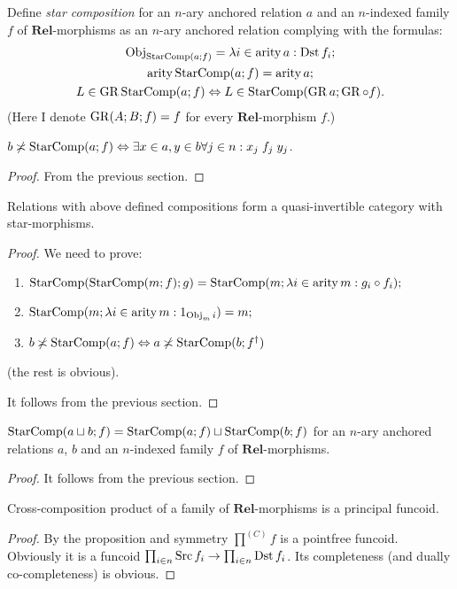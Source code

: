 Define \emph{star composition} for an $n$-ary anchored relation $a$
and an $n$-indexed family $f$ of $\mathbf{Rel}$-morphisms as an
$n$-ary anchored relation complying with the formulas: 
\begin{gather*}
\operatorname{Obj}_{\operatorname{StarComp}(a;f)}=\lambda i\in\operatorname{arity} a:\operatorname{Dst} f_{i};\\
\operatorname{arity}\operatorname{StarComp}(a;f)=\operatorname{arity} a;\\
L\in\operatorname{GR}\operatorname{StarComp}(a;f)\Leftrightarrow L\in\operatorname{StarComp}(\operatorname{GR} a;\operatorname{GR}\circ f).
\end{gather*}
(Here I denote $\operatorname{GR}(A;B;f)=f$ for every $\mathbf{Rel}$-morphism $f$.)
\begin{prop}
$b\not\asymp\operatorname{StarComp}(a;f)\Leftrightarrow\exists x\in a,y\in b\forall j\in n:x_{j}\mathrel{f_{j}}y_{j}$.\end{prop}
\begin{proof}
From the previous section.\end{proof}
\begin{thm}
Relations with above defined compositions form a quasi-invertible
category with star-morphisms.\end{thm}
\begin{proof}
We need to prove:
\begin{enumerate}
\item $\operatorname{StarComp}(\operatorname{StarComp}(m;f);g)=\operatorname{StarComp}(m;\lambda i\in\operatorname{arity} m:g_{i}\circ f_{i});$
\item $\operatorname{StarComp}(m;\lambda i\in\operatorname{arity} m:1_{\operatorname{Obj}_{m}i})=m;$
\item $b\not\asymp\operatorname{StarComp}(a;f)\Leftrightarrow a\not\asymp\operatorname{StarComp}(b;f^{\dagger})$
\end{enumerate}
(the rest is obvious).

It follows from the previous section.\end{proof}
\begin{prop}
$\operatorname{StarComp}(a\sqcup b;f)=\operatorname{StarComp}(a;f)\sqcup\operatorname{StarComp}(b;f)$ for an
$n$-ary anchored relations $a$, $b$ and an $n$-indexed family
$f$ of $\mathbf{Rel}$-morphisms.\end{prop}
\begin{proof}
It follows from the previous section.\end{proof}
\begin{thm}
Cross-composition product of a family of $\mathbf{Rel}$-morphisms
is a principal funcoid.\end{thm}
\begin{proof}
By the proposition and symmetry $\prod^{(C)}f$ is a pointfree funcoid.
Obviously it is a funcoid $\prod_{i\in n}\operatorname{Src} f_{i}\rightarrow\prod_{i\in n}\operatorname{Dst} f_{i}$.
Its completeness (and dually co-completeness) is obvious.
\end{proof}

